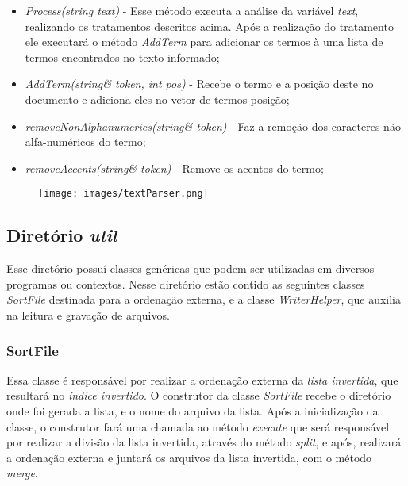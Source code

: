 \documentclass[12pt]{article}
\begin{document}
\begin{itemize}
\item \textit{Process(string text)} - Esse método executa a análise da variável \textit{text}, realizando os tratamentos descritos acima. Após a realização do tratamento ele executará o método \textit{AddTerm} para adicionar os termos à uma lista de termos encontrados no texto informado;
\item \textit{AddTerm(string\& token, int pos)} - Recebe o termo e a posição deste no documento e adiciona eles no vetor de termos-posição;
\item \textit{removeNonAlphanumerics(string\& token)} - Faz a remoção dos caracteres não alfa-numéricos do termo;
\item \textit{removeAccents(string\& token)} - Remove os acentos do termo;
\end{itemize}

\begin{figure}[ht]
\centering
\texttt{[image: images/textParser.png]}
\label{fig:textParser}
\end{figure}

\subsection{Diretório \textit{util}} \label{ssec:util}

Esse diretório possuí classes genéricas que podem ser utilizadas em diversos programas ou contextos. Nesse diretório estão contido as seguintes classes \textit{SortFile} destinada para a ordenação externa, e a classe \textit{WriterHelper}, que auxilia na leitura e gravação de arquivos.

\subsubsection{SortFile} \label{sssec:sortfile}

Essa classe é responsável por realizar a ordenação externa da \textit{lista invertida}, que resultará no \textit{índice invertido}. O construtor da classe \textit{SortFile} recebe o diretório onde foi gerada a lista, e o nome do arquivo da lista. Após a inicialização da classe, o construtor fará uma chamada ao método \textit{execute} que será responsável por realizar a divisão da lista invertida, através do método \textit{split}, e após, realizará a ordenação externa e juntará os arquivos da lista invertida, com o método \textit{merge}.
\end{document}
